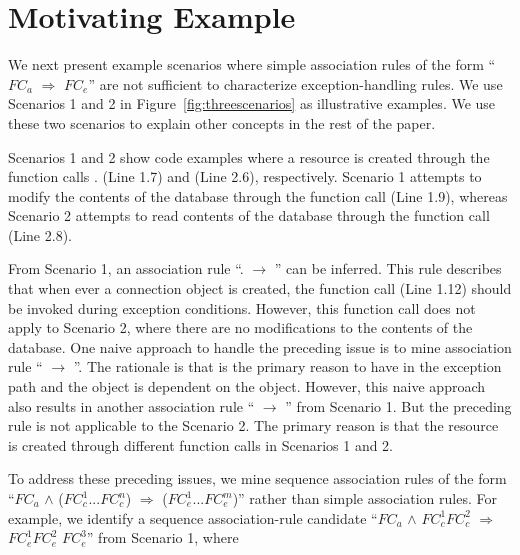 \section{Motivating Example}
\label{sec:example}

We next present example scenarios where simple association
rules of the form ``$FC_a$ $\Rightarrow$ $FC_e$'' are not sufficient to 
characterize exception-handling rules. We use Scenarios 1 and 2 
in Figure~\ref{fig:threescenarios} as illustrative examples. We use
these two scenarios to explain other concepts in the rest of the paper.

Scenarios 1 and 2 show code examples where a  resource is created through 
the function calls . (Line 1.7)
and  (Line 2.6), respectively. Scenario 1
attempts to modify the contents of the database through the function call
 (Line 1.9), whereas Scenario 2 attempts to read contents
of the database through the function call  (Line 2.8).

From Scenario 1, an association rule ``.
$\rightarrow$ '' can be inferred.
This rule describes that when ever a connection object is created, 
the function call  (Line 1.12) should be invoked during exception conditions.
However, this  function call does not apply to Scenario 2, where there are no modifications
to the contents of the database. One naive approach to handle the preceding issue is to mine
association rule `` $\rightarrow$
''. The rationale is that 
is the primary reason to have  in the exception path
and the  object is dependent on the  object.
However, this naive approach also results in another association rule 
`` $\rightarrow$ ''
from Scenario 1. But the preceding rule is not applicable to the 
Scenario 2. The primary reason is that the 
resource is created through different function calls in Scenarios 1 and 2. 

To address these preceding issues, we mine sequence association rules of
the form ``$FC_a$ $\wedge$ ($FC_c^1$...$FC_c^n$) $\Rightarrow$ ($FC_e^1$...$FC_e^m$)''
rather than simple association rules. For example, we identify
a sequence association-rule candidate ``$FC_a$ $\wedge$ $FC_c^1$$FC_c^2$ $\Rightarrow$ $FC_e^1$$FC_e^2$
$FC_e^3$'' from Scenario 1, where

